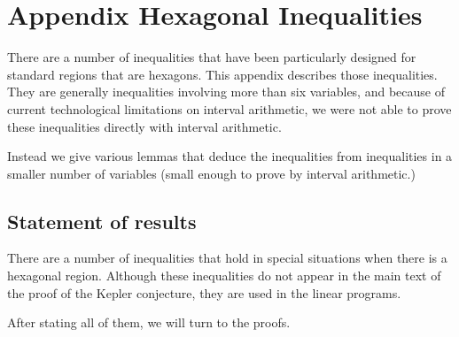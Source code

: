 \section{Appendix Hexagonal Inequalities}

There are a number of inequalities that have been particularly
designed for standard regions that are hexagons.  This appendix
describes those inequalities.  They are generally inequalities
involving more than six variables, and because of current
technological limitations on interval arithmetic, we were not able
to prove these inequalities directly with interval arithmetic.

Instead we give various lemmas that deduce the inequalities from
inequalities in a smaller number of variables (small enough to
prove by interval arithmetic.)


\subsection{Statement of results} %



There are a number of inequalities that hold in special situations
when there is a hexagonal region.  Although these inequalities do
not appear in the main text of the proof of the Kepler conjecture,
they are used in the linear programs.

After stating all of them, we will turn to the proofs.

